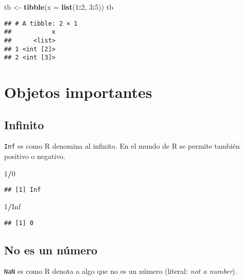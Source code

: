 \documentclass[]{article}
\newenvironment{Shaded}{\begin{snugshade}}{\end{snugshade}}
\newcommand{\KeywordTok}[1]{\textcolor[rgb]{0.13,0.29,0.53}{\textbf{#1}}}
\newcommand{\DataTypeTok}[1]{\textcolor[rgb]{0.13,0.29,0.53}{#1}}
\newcommand{\DecValTok}[1]{\textcolor[rgb]{0.00,0.00,0.81}{#1}}
\newcommand{\StringTok}[1]{\textcolor[rgb]{0.31,0.60,0.02}{#1}}
\newcommand{\OtherTok}[1]{\textcolor[rgb]{0.56,0.35,0.01}{#1}}
\newcommand{\OperatorTok}[1]{\textcolor[rgb]{0.81,0.36,0.00}{\textbf{#1}}}
\newcommand{\NormalTok}[1]{#1}
\begin{document}
\begin{Shaded}
\begin{Highlighting}[]
\NormalTok{tb <-}\StringTok{ }\KeywordTok{tibble}\NormalTok{(}\DataTypeTok{x =} \KeywordTok{list}\NormalTok{(}\DecValTok{1}\OperatorTok{:}\DecValTok{2}\NormalTok{, }\DecValTok{3}\OperatorTok{:}\DecValTok{5}\NormalTok{))}
\NormalTok{tb}
\end{Highlighting}
\end{Shaded}

\begin{verbatim}
## # A tibble: 2 × 1
##           x
##      <list>
## 1 <int [2]>
## 2 <int [3]>
\end{verbatim}

\section{Objetos importantes}\label{objetos-importantes}

\subsection{Infinito}\label{infinito}

\texttt{Inf} es como R denomina al infinito. En el mundo de R se permite
también positivo o negativo.

\begin{Shaded}
\begin{Highlighting}[]
\DecValTok{1}\OperatorTok{/}\DecValTok{0}
\end{Highlighting}
\end{Shaded}

\begin{verbatim}
## [1] Inf
\end{verbatim}

\begin{Shaded}
\begin{Highlighting}[]
\DecValTok{1}\OperatorTok{/}\OtherTok{Inf}
\end{Highlighting}
\end{Shaded}

\begin{verbatim}
## [1] 0
\end{verbatim}

\subsection{No es un número}\label{no-es-un-numero}

\texttt{NaN} es como R denota a algo que no es un número (literal:
\emph{not a number}).
\end{document}

